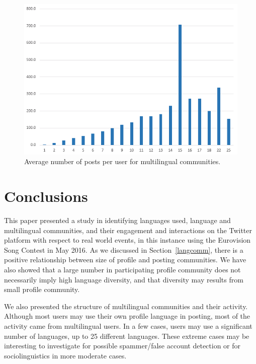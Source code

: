 \documentclass[conference]{IEEEtran}
\begin{document}
\begin{figure}[!htb]
\centering
\includegraphics[width=\columnwidth]{images/multilingualpostsperuser.png}
\caption{Average number of posts per user for multilingual communities.}
\label{fig:multilingualpostsperuser}
\end{figure}


\section{Conclusions}\label{conclusions}

This paper presented a study in identifying languages used, language
and multilingual communities, and their engagement and interactions on
the Twitter platform with respect to real world events, in this
instance using the Eurovision Song Contest in May 2016.  As we
discussed in Section~\ref{langcomm}, there is a positive relationship
between size of profile and posting communities. We have also showed
that a large number in participating profile community does not
necessarily imply high language diversity, and that diversity may
results from small profile community.

We also presented the structure of multilingual communities and their
activity. Although most users may use their own profile language in
posting, most of the activity came from multilingual users. In a few
cases, users may use a significant number of languages, up to 25
different languages. These extreme cases may be interesting to
investigate for possible spammer/false account detection or for
sociolinguistics in more moderate cases.
\end{document}
